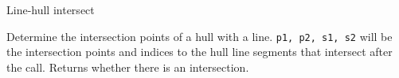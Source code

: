 
\begin{algorithm}{Line-hull intersect}

\desc
Determine the intersection points of a hull with a line.
{\tt p1, p2, s1, s2} will be the intersection points and indices to the hull
line segments that intersect after the call. Returns whether there is an
intersection.
\end{algorithm}

